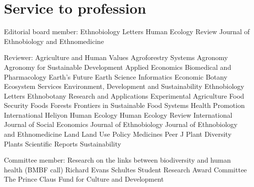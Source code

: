 \documentclass[11pt,a4paper,]{awesome-cv}
\begin{document}
\section{Service to profession}\label{service-to-profession}

\begingroup
{}\fontsize{12}{16}\selectfont\color{darktext}

Editorial board member: \fontsize{9}{16}\selectfont
Ethnobiology Letters \bullet Human Ecology Review \bullet  Journal of
Ethnobiology and Ethnomedicine \endgroup

\begingroup
{}\fontsize{12}{16}\selectfont\color{darktext}

Reviewer: \fontsize{9}{16}\selectfont Agriculture and
Human Values \bullet  Agroforestry Systems \bullet  Agronomy \bullet 
Agronomy for Sustainable Development \bullet  Applied Economics \bullet 
Biomedical and Pharmacology \bullet  Earth's Future \bullet  Earth
Science Informatics \bullet  Economic Botany \bullet  Ecosystem Services
\bullet  Environment, Development and Sustainability \bullet 
Ethnobiology Letters \bullet  Ethnobotany Research and Applications
\bullet  Experimental Agriculture \bullet  Food Security \bullet  Foods
\bullet  Forests \bullet  Frontiers in Sustainable Food Systems \bullet 
Health Promotion International \bullet  Heliyon \bullet Human Ecology
\bullet  Human Ecology Review \bullet  International Journal of Social
Economics \bullet  Journal of Ethnobiology \bullet  Journal of
Ethnobiology and Ethnomedicine \bullet  Land \bullet  Land Use Policy
\bullet  Medicines \bullet  Peer J \bullet  Plant Diversity \bullet 
Plants \bullet  Scientific Reports \bullet  Sustainability \endgroup

\begingroup
{}\fontsize{12}{16}\selectfont\color{darktext}

Committee member: \fontsize{9}{16}\selectfont Research
on the links between biodiversity and human health (BMBF call) \bullet
Richard Evans Schultes Student Research Award Committee \bullet  The
Prince Claus Fund for Culture and Development \bullet  \endgroup
\end{document}
